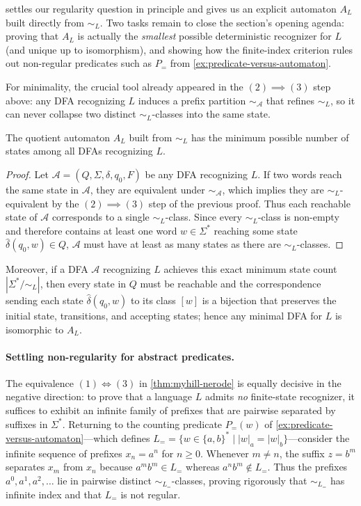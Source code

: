  settles our regularity question in principle and gives us an explicit automaton $A_L$ built directly from $\sim_L$. Two tasks remain to close the section's opening agenda: proving that $A_L$ is actually the \emph{smallest} possible deterministic recognizer for $L$ (and unique up to isomorphism), and showing how the finite-index criterion rules out non-regular predicates such as $P_{=}$ from \cref{ex:predicate-versus-automaton}.

For minimality, the crucial tool already appeared in the $(2)\implies(3)$ step above: any DFA recognizing $L$ induces a prefix partition $\sim_{\mathcal{A}}$ that refines $\sim_L$, so it can never collapse two distinct $\sim_L$-classes into the same state.

\begin{proposition}[Minimality]
\label{prop:myhill-nerode-minimality}
The quotient automaton $A_L$ built from $\sim_L$ has the minimum possible
number of states among all DFAs recognizing $L$.
\end{proposition}

\begin{proof}
Let $\mathcal{A}=(Q,\Sigma,\delta,q_0,F)$ be any DFA recognizing $L$. If two words reach the same state
in $\mathcal{A}$, they are equivalent under $\sim_{\mathcal{A}}$, which implies they are $\sim_L$-equivalent by the $(2) \implies (3)$ step of the previous proof. Thus each reachable state of $\mathcal{A}$ corresponds to a single $\sim_L$-class. Since every $\sim_L$-class is non-empty and therefore contains at least one word $w\in\Sigma^*$ reaching some state $\widehat{\delta}(q_0,w)\in Q$, $\mathcal{A}$ must have at least as many states as there are $\sim_L$-classes.
\end{proof}

Moreover, if a DFA $\mathcal{A}$ recognizing $L$ achieves this exact minimum state count $|\Sigma^*/{\sim_L}|$, then every state in $Q$ must be reachable and the correspondence sending each state $\widehat{\delta}(q_0,w)$ to its class $[w]$ is a bijection that preserves the initial state, transitions, and accepting states; hence any minimal DFA for $L$ is isomorphic to $A_L$.

\paragraph{Settling non-regularity for abstract predicates.}
The equivalence $(1)\iff(3)$ in \cref{thm:myhill-nerode} is equally decisive in the negative direction: to prove that a language $L$ admits \emph{no} finite-state recognizer, it suffices to exhibit an infinite family of prefixes that are pairwise separated by suffixes in $\Sigma^*$. Returning to the counting predicate $P_{=}(w)$ of \cref{ex:predicate-versus-automaton}---which defines $L_{=}=\{w\in\{a,b\}^*\mid |w|_a=|w|_b\}$---consider the infinite sequence of prefixes $x_n=a^n$ for $n\ge 0$. Whenever $m\neq n$, the suffix $z=b^m$ separates $x_m$ from $x_n$ because $a^m b^m \in L_{=}$ whereas $a^n b^m \notin L_{=}$. Thus the prefixes $a^0, a^1, a^2, \ldots$ lie in pairwise distinct $\sim_{L_{=}}$-classes, proving rigorously that $\sim_{L_{=}}$ has infinite index and that $L_{=}$ is not regular.

